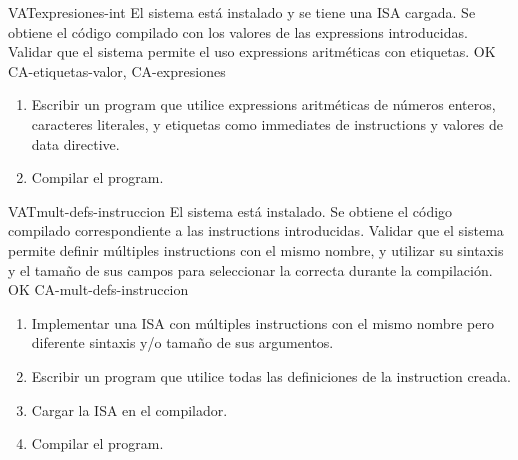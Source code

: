 \begin{testCase}{VAT}{expresiones-int}
    {El sistema está instalado y se tiene una \gls{ISA} cargada.} %
    {Se obtiene el código compilado con los valores de las \glspl{expression} introducidas.} %
    {Validar que el sistema permite el uso \glspl{expression} aritméticas con etiquetas.} %
    {OK} %
    {CA-etiquetas-valor, CA-expresiones} %
    \begin{enumerate}[leftmargin=*, topsep=0pt, noitemsep] %
        \item Escribir un \gls{program} que utilice \glspl{expression}
        aritméticas de números enteros, caracteres literales, y etiquetas como
        \glspl{immediate} de \glspl{instruction} y valores de \gls{data
        directive}.
        \item Compilar el \gls{program}.
    \end{enumerate}
\end{testCase}

\begin{testCase}{VAT}{mult-defs-instruccion}
    {El sistema está instalado.} %
    {Se obtiene el código compilado correspondiente a las \glspl{instruction} introducidas.} %
    {Validar que el sistema permite definir múltiples \glspl{instruction} con
    el mismo nombre, y utilizar su sintaxis y el tamaño de sus campos para
    seleccionar la correcta durante la compilación.} %
    {OK} %
    {CA-mult-defs-instruccion} %
    \begin{enumerate}[leftmargin=*, topsep=0pt, noitemsep] %
        \item Implementar una \gls{ISA} con múltiples \glspl{instruction} con el
        mismo nombre pero diferente sintaxis y/o tamaño de sus argumentos.
        \item Escribir un \gls{program} que utilice todas las definiciones de la
        \gls{instruction} creada.
        \item Cargar la \gls{ISA} en el compilador.
        \item Compilar el \gls{program}.
    \end{enumerate}
\end{testCase}

